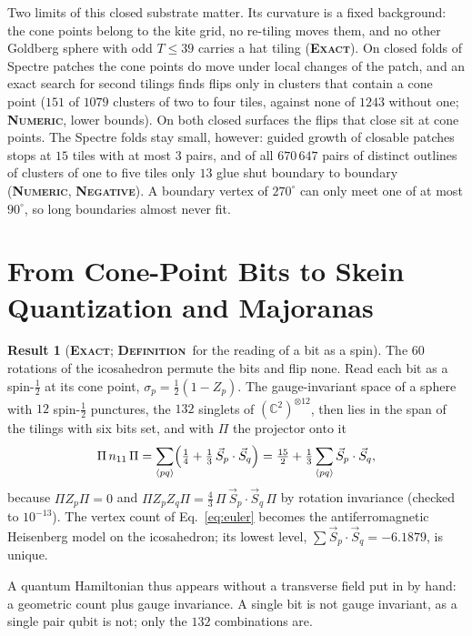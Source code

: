 \documentclass[11pt]{article}
\newcommand{\exact}{\textbf{\textsc{Exact}}}
\newcommand{\numeric}{\textbf{\textsc{Numeric}}}
\newcommand{\negres}{\textbf{\textsc{Negative}}}
\newcommand{\defn}{\textbf{\textsc{Definition}}}
\theoremstyle{definition}
\newtheorem{result}{Result}
\begin{document}
Two limits of this closed substrate matter. Its curvature is a fixed background: the cone points belong to the kite grid, no re-tiling moves them, and no other Goldberg sphere with odd $T\le39$ carries a hat tiling (\exact). On closed folds of Spectre patches the cone points do move under local changes of the patch, and an exact search for second tilings finds flips only in clusters that contain a cone point ($151$ of $1079$ clusters of two to four tiles, against none of $1243$ without one; \numeric, lower bounds). On both closed surfaces the flips that close sit at cone points. The Spectre folds stay small, however: guided growth of closable patches stops at $15$ tiles with at most $3$ pairs, and of all $670\,647$ pairs of distinct outlines of clusters of one to five tiles only $13$ glue shut boundary to boundary (\numeric, \negres). A boundary vertex of $270^\circ$ can only meet one of at most $90^\circ$, so long boundaries almost never fit.

\section{From Cone-Point Bits to Skein Quantization and Majoranas}
\label{sec:quant}
\begin{result}[\exact; \defn\ for the reading of a bit as a spin]\label{res:punctures}
The $60$ rotations of the icosahedron permute the bits and flip none. Read each bit as a spin-$\tfrac12$ at its cone point, $\sigma_p=\tfrac12(1-Z_p)$. The gauge-invariant space of a sphere with $12$ spin-$\tfrac12$ punctures, the $132$ singlets of $(\mathbb{C}^2)^{\otimes12}$, then lies in the span of the tilings with six bits set, and with $\Pi$ the projector onto it
\begin{equation}\label{eq:chain}
\Pi\,n_{11}\,\Pi=\sum_{\langle pq\rangle}\Bigl(\tfrac14+\tfrac13\,\vec S_p\cdot\vec S_q\Bigr)=\tfrac{15}2+\tfrac13\sum_{\langle pq\rangle}\vec S_p\cdot\vec S_q ,
\end{equation}
because $\Pi Z_p\Pi=0$ and $\Pi Z_pZ_q\Pi=\tfrac43\,\Pi\,\vec S_p\cdot\vec S_q\,\Pi$ by rotation invariance (checked to $10^{-13}$). The vertex count of Eq.~\eqref{eq:euler} becomes the antiferromagnetic Heisenberg model on the icosahedron; its lowest level, $\sum\vec S_p\cdot\vec S_q=-6.1879$, is unique.
\end{result}
A quantum Hamiltonian thus appears without a transverse field put in by hand: a geometric count plus gauge invariance. A single bit is not gauge invariant, as a single pair qubit is not; only the $132$ combinations are.
\end{document}
